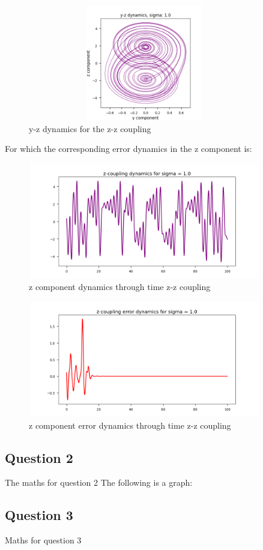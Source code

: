 \documentclass{article}
\begin{document}
\begin{figure}[H]
\centering
\includegraphics[width = 4in, height = 2in]{z_coupling_yz.png}
\caption{y-z dynamics for the z-z coupling}
\end{figure}

For which the corresponding error dynamics in the z component is:

\begin{figure}[H]
\centering
\includegraphics[width = 4in, height = 2in]{z_coupling_z_dynamics_s1.png}
\caption{z component dynamics through time z-z coupling}
\end{figure}

\begin{figure}[H]
\centering
\includegraphics[width = 4in, height = 2in]{z_coupling_z_error_s1.png}
\caption{z component error dynamics through time z-z coupling}
\end{figure}




\subsection*{Question 2}
The maths for question 2
The following is a graph:


\subsection*{Question 3}
Maths for question 3
\end{document}
